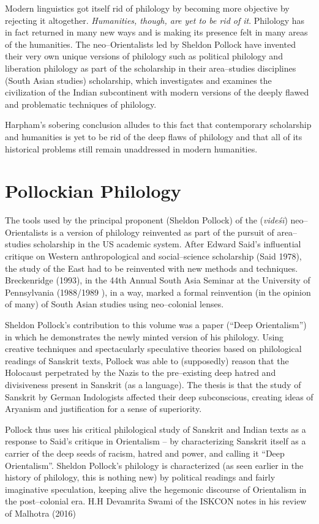 Modern linguistics got itself rid of philology by becoming more objective by rejecting it altogether. \textit{Humanities, though, are yet to be rid of it}. Philology has in fact returned in many new ways and is making its presence felt in many areas of the humanities. The neo–Orientalists led by Sheldon Pollock have invented their very own unique versions of philology such as political philology and liberation philology as part of the scholarship in their area–studies disciplines (South Asian studies) scholarship, which investigates and examines the civilization of the Indian subcontinent with modern versions of the deeply flawed and problematic techniques of philology.

Harpham’s sobering conclusion alludes to this fact that contemporary scholarship and humanities is yet to be rid of the deep flaws of philology and that all of its historical problems still remain unaddressed in modern humanities.


\section*{Pollockian Philology}

The tools used by the principal proponent (Sheldon Pollock) of the (\textit{videśī}) neo–Orientalists is a version of philology reinvented as part of the pursuit of area–studies scholarship in the US academic system. After Edward Said’s influential critique on Western anthropological and social–science scholarship (Said 1978), the study of the East had to be reinvented with new methods and techniques. Breckenridge (1993), in the 44th Annual South Asia Seminar at the University of Pennsylvania (1988/1989 ), in a way, marked a formal reinvention (in the opinion of many) of South Asian studies using neo–colonial lenses.

Sheldon Pollock’s contribution to this volume was a paper (“Deep Orientalism”) in which he demonstrates the newly minted version of his philology. Using creative techniques and spectacularly speculative theories based on philological readings of Sanskrit texts, Pollock was able to (supposedly) reason that the Holocaust perpetrated by the Nazis to the pre–existing deep hatred and divisiveness present in Sanskrit (as a language). The thesis is that the study of Sanskrit by German Indologists affected their deep subconscious, creating ideas of Aryanism and justification for a sense of superiority.

Pollock thus uses his critical philological study of Sanskrit and Indian texts as a response to Said’s critique in Orientalism – by characterizing Sanskrit itself as a carrier of the deep seeds of racism, hatred and power, and calling it “Deep Orientalism”. Sheldon Pollock’s philology is characterized (as seen earlier in the history of philology, this is nothing new) by political readings and fairly imaginative speculation, keeping alive the hegemonic discourse of Orientalism in the post–colonial era. H.H Devamrita Swami of the ISKCON notes in his review of Malhotra (2016)

